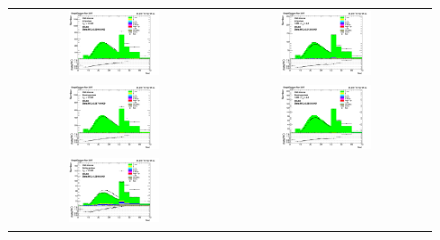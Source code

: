 \begin{figure}[htp]
  \begin{center}
    \begin{tabular}{cc}
      \includegraphics[width=0.45\textwidth]{figures/Zprime/2017/ScaleFactor/SameSign/nominal/stack_nVtx_Barrel_probes_PUW.png} &
      \includegraphics[width=0.45\textwidth]{figures/Zprime/2017/ScaleFactor/SameSign/nominal/stack_nVtx_Endcap_probes_PUW.png} \\
      \includegraphics[width=0.45\textwidth]{figures/Zprime/2017/ScaleFactor/SameSign/nominal/stack_nVtx_Barrel_pass_PUW.png} &
      \includegraphics[width=0.45\textwidth]{figures/Zprime/2017/ScaleFactor/SameSign/nominal/stack_nVtx_Endcap_pass_PUW.png}\\
      \includegraphics[width=0.45\textwidth]{figures/Zprime/2017/ScaleFactor/SameSign/nominal/stack_nVtx_Barrel_fail_PUW.png} &

\end{tabular}
\end{center}
\end{figure}
